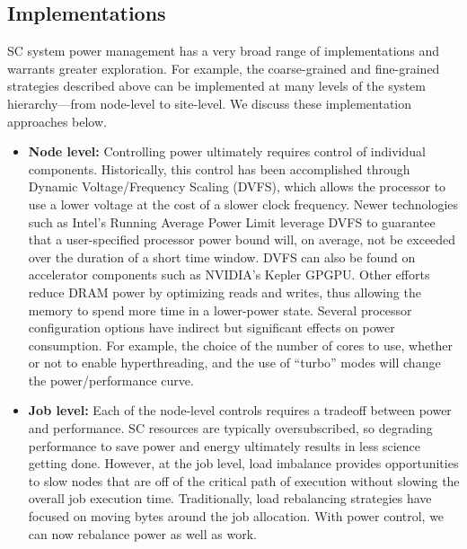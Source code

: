 \subsection{Implementations}
SC system power management has a very broad range of implementations and warrants greater exploration. For example, the coarse-grained and fine-grained strategies described above can be implemented at many levels of the system hierarchy---from node-level to site-level. We discuss these implementation approaches below.  

\begin{itemize}
\item \textbf{Node level:} Controlling power ultimately requires control of individual
components. Historically, this control has been accomplished through Dynamic Voltage/Frequency Scaling (DVFS), which allows the processor to use a lower voltage at the cost of a slower clock frequency. Newer technologies such as Intel's Running Average Power Limit leverage DVFS to guarantee that a user-specified processor power bound will, on average, not be exceeded over the duration of a short time window. DVFS can also be found on accelerator components such as NVIDIA's Kepler GPGPU. Other efforts reduce DRAM power by optimizing reads and writes, thus allowing the memory to spend more time in a lower-power state. Several processor configuration options have indirect but significant effects on power consumption. For example, the choice of the number of cores to use, whether or not to enable hyperthreading, and the use of ``turbo'' modes will change the power/performance curve.

\item \textbf{Job level:} Each of the node-level controls requires a tradeoff between
power and performance. SC resources are typically oversubscribed, so degrading performance
to save power and energy ultimately results in less science getting done. However, at the 
job level, load imbalance provides opportunities to slow nodes that are off of the critical
path of execution without slowing the overall job execution time. Traditionally, load 
rebalancing strategies have focused on moving bytes around the job allocation. With 
power control, we can now rebalance power as well as work.


\end{itemize}
